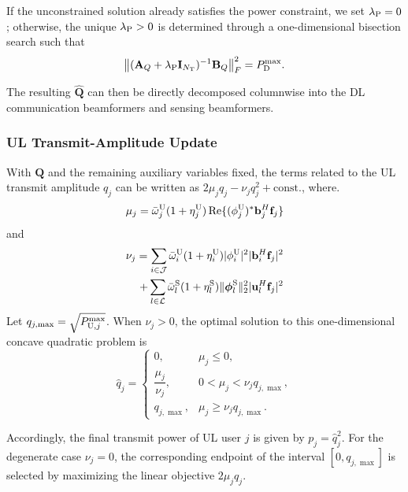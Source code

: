 \documentclass[letterpaper,journal]{IEEEtran}
\begin{document}
If the unconstrained solution already satisfies the power constraint, we set $\lambda_{\rm P}=0$; otherwise, the unique $\lambda_{\rm P}>0$ is determined through a one-dimensional bisection search such that
\begin{equation}
\left\|
(\mathbf A_Q+\lambda_{\rm P}\mathbf I_{N_{\rm T}})^{-1}
\mathbf B_Q
\right\|_F^2
=
P_{\rm D}^{\max}.
\label{eq:Q_power_boundary}
\end{equation}

The resulting $\widehat{\mathbf Q}$ can then be directly decomposed columnwise into the DL communication beamformers and sensing beamformers.

\subsubsection{UL Transmit-Amplitude Update}

With $\mathbf Q$ and the remaining auxiliary variables fixed, the terms related to the UL transmit amplitude $q_j$ can be written as $2\mu_jq_j-\nu_jq_j^2+\text{const.}$, where.
\begin{equation}
\begin{aligned}
\mu_j=\bar\omega_j^{\rm U}(1+\eta_j^{\rm U})\operatorname{Re}\{(\phi_j^{\rm U})^*\mathbf b_j^H\mathbf f_j\}
\end{aligned}
\end{equation}
and
\begin{equation}
\begin{aligned}
\nu_j=\sum_{i\in\mathcal J}\bar\omega_i^{\rm U}(1+\eta_i^{\rm U})|\phi_i^{\rm U}|^2|\mathbf b_i^H\mathbf f_j|^2
\\
+
\sum_{l\in\mathcal L}\bar\omega_l^{\rm S}(1+\eta_l^{\rm S})\|\boldsymbol\phi_l^{\rm S}\|_2^2|\mathbf u_l^H\mathbf f_j|^2
\end{aligned}
\end{equation}
Let $q_{j,\max}=\sqrt{P_{{\rm U},j}^{\max}}$. When $\nu_j>0$, the optimal solution to this one-dimensional concave quadratic problem is
\begin{equation}
\widehat q_j
=
\begin{cases}
0,
& \mu_j\le0,\\[1mm]
\dfrac{\mu_j}{\nu_j},
& 0<\mu_j<\nu_jq_{j,\max},\\[2mm]
q_{j,\max},
& \mu_j\ge\nu_jq_{j,\max}.
\end{cases}
\label{eq:q_update}
\end{equation}

Accordingly, the final transmit power of UL user $j$ is given by $p_j=\widehat q_j^2$. For the degenerate case $\nu_j=0$, the corresponding endpoint of the interval $[0,q_{j,\max}]$ is selected by maximizing the linear objective $2\mu_jq_j$.
\end{document}
